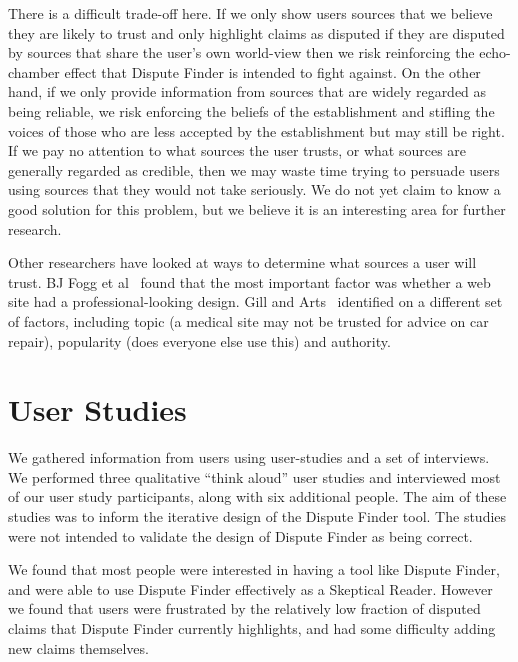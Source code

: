 \documentclass{www2010-accepted}
\newcommand{\todo}[1]{}
\begin{document}
There is a difficult trade-off here. If we only show users sources that we believe they are likely to trust and only highlight claims as disputed if they are disputed by sources that share the user's own world-view then we risk reinforcing the echo-chamber effect that Dispute Finder is intended to fight against. On the other hand, if we only provide information from sources that are widely regarded as being reliable, we risk enforcing the beliefs of the establishment and stifling the voices of those who are less accepted by the establishment but may still be right. If we pay no attention to what sources the user trusts, or what sources are generally regarded as credible, then we may waste time trying to persuade users using sources that they would not take seriously. We do not yet claim to know a good solution for this problem, but we believe it is an interesting area for further research.

\todo{Cite Pew Research study saying people like to read news that supports their own point of view, but many others like neutral sources. http://people-press.org/report/?pageid=1353}

Other researchers have looked at ways to determine what sources a user will trust. 
BJ Fogg et al~\cite{Fogg2003} found that the most important factor was whether a web site had a professional-looking design. Gill and Arts~\cite{Gil2006} identified on a different set of factors, including topic (a medical site may not be trusted for advice on car repair), popularity (does everyone else use this) and authority.


\section{User Studies}
\label{sec:interviews}
\label{user-studies}

We gathered information from users using user-studies and a set of interviews. We performed three qualitative ``think aloud'' user studies and interviewed most of our user study participants, along with six additional people. The aim of these studies was to inform the iterative design of the Dispute Finder tool. The studies were not intended to validate the design of Dispute Finder as being correct. 

We found that most people were interested in having a tool like Dispute Finder, and were able to use Dispute Finder effectively as a Skeptical Reader. However we found that users were frustrated by the relatively low fraction of disputed claims that Dispute Finder currently highlights, and had some difficulty adding new claims themselves.
\end{document}
